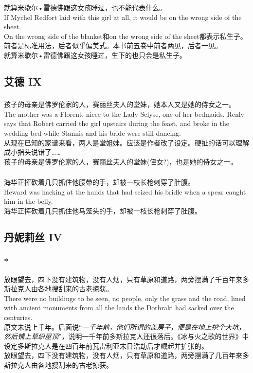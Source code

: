 \documentclass[12pt,a4paper]{article}
\newcommand{\h}[1]{{\color{red}#1}\\}
\newcommand{\la}[1]{{\color{blue}#1}\\}
\begin{document}
\subsubsection{}\la{
	就算米歇尔•雷德佛跟这女孩睡过，也不能代表什么。\\
	If Mychel Redfort laid with this girl at all, it would be on the wrong side of the sheet.}\h{
	On the wrong side of the blanket和on the wrong side of the sheet都表示私生子。前者是标准用法，后者似乎偏美式。本书前五卷中前者两见，后者一见。}
	就算米歇尔•雷德佛跟这女孩睡过，生下的也只会是私生子。
	
		
\subsection{艾德 IX}
\subsubsection{}\la{
	孩子的母亲是佛罗伦家的人，赛丽丝夫人的堂妹，她本人又是她的侍女之一。\\
	The mother was a Florent, niece to the Lady Selyse, one of her bedmaids. Renly says that Robert carried the girl upstairs during the feast, and broke in the wedding bed while Stannis and his bride were still dancing.}\h{
	从现在已知的家谱来看，两人是堂姐妹。应该是作者改了设定。硬扯的话可以理解成小指头说错了……}
	孩子的母亲是佛罗伦家的人，赛丽丝夫人的堂妹(侄女?)，也是她的侍女之一。
	
\subsubsection{}\la{
	海华正挥砍着几只抓住他腰带的手，却被一枝长枪刺穿了肚腹。\\
	Heward was hacking at the hands that had seized his bridle when a spear caught him in the belly. }
	海华正挥砍着几只抓住他马笼头的手，却被一枝长枪刺穿了肚腹。
		
\subsection{丹妮莉丝 IV}
\subsubsection{\color{red}*}\la{
	放眼望去，四下没有建筑物，没有人烟，只有草原和道路，两旁摆满了千百年来多斯拉克人由各地搜刮来的古老掠获。\\
	There were no buildings to be seen, no people, only the grass and the road, lined with ancient monuments from all the lands the Dothraki had sacked over the centuries.}\h{
	原文未说上千年。后面说“\emph{一千年前，他们所谓的盖房子，便是在地上挖个大坑，然后铺上草织屋顶}”，说明一千年前多斯拉克人还很落后。《冰与火之歌的世界》中设定多斯拉克人是在四百年前瓦雷利亚末日浩劫后才崛起并扩张的。}
	放眼望去，四下没有建筑物，没有人烟，只有草原和道路，两旁摆满了几百年来多斯拉克人由各地搜刮来的古老掠获。
	
\end{document}
